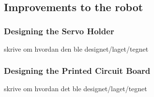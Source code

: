 \subsection{Improvements to the robot}

\subsubsection{Designing the Servo Holder}
skrive om hvordan den ble designet/laget/tegnet

\subsubsection{Designing the Printed Circuit Board}
skrive om hvordan det ble designet/laget/tegnet